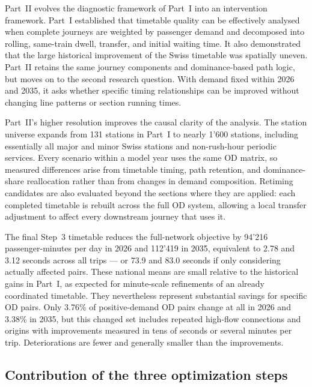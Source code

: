 \documentclass[preprint,12pt]{elsarticle}
\begin{document}
Part~II evolves the diagnostic framework of Part~I into an intervention framework. Part~I established that timetable quality can be effectively analysed when complete journeys are weighted by passenger demand and decomposed into rolling, same-train dwell, transfer, and initial waiting time. It also demonstrated that the large historical improvement of the Swiss timetable was spatially uneven. Part~II retains the same journey components and dominance-based path logic, but moves on to the second research question. With demand fixed within 2026 and 2035, it asks whether specific timing relationships can be improved without changing line patterns or section running times.

Part~II's higher resolution improves the causal clarity of the analysis. The station universe expands from 131 stations in Part~I to nearly 1'600 stations, including essentially all major and minor Swiss stations and non-rush-hour periodic services. Every scenario within a model year uses the same OD matrix, so measured differences arise from timetable timing, path retention, and dominance-share reallocation rather than from changes in demand composition. Retiming candidates are also evaluated beyond the sections where they are applied: each completed timetable is rebuilt across the full OD system, allowing a local transfer adjustment to affect every downstream journey that uses it.

The final Step~3 timetable reduces the full-network objective by 94'216 passenger-minutes per day in 2026 and 112'419 in 2035, equivalent to 2.78 and 3.12 seconds across all trips — or 73.9 and 83.0 seconds if only considering actually affected pairs. These national means are small relative to the historical gains in Part~I, as expected for minute-scale refinements of an already coordinated timetable. They nevertheless represent substantial savings for specific OD pairs. Only 3.76\% of positive-demand OD pairs change at all in 2026 and 3.38\% in 2035, but this changed set includes repeated high-flow connections and origins with improvements measured in tens of seconds or several minutes per trip. Deteriorations are fewer and generally smaller than the improvements.


\subsection{Contribution of the three optimization steps}\label{sec:discussion-part2-steps}
\end{document}
